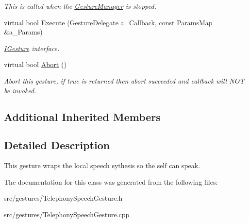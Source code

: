 \begin{DoxyCompactItemize}
\begin{DoxyCompactList}\small\item\em This is called when the \hyperlink{class_gesture_manager}{Gesture\+Manager} is stopped. \end{DoxyCompactList}\item 
\mbox{\label{class_telephony_speech_gesture_a9ee4eca6da4830ddcbcffd5c3a13cd30}} 
virtual bool \hyperlink{class_telephony_speech_gesture_a9ee4eca6da4830ddcbcffd5c3a13cd30}{Execute} (Gesture\+Delegate a\+\_\+\+Callback, const \hyperlink{class_params_map}{Params\+Map} \&a\+\_\+\+Params)
\begin{DoxyCompactList}\small\item\em \hyperlink{class_i_gesture}{I\+Gesture} interface. \end{DoxyCompactList}\item 
\mbox{\label{class_telephony_speech_gesture_a763ffe66a7747b2abc19203f9dc73352}} 
virtual bool \hyperlink{class_telephony_speech_gesture_a763ffe66a7747b2abc19203f9dc73352}{Abort} ()
\begin{DoxyCompactList}\small\item\em Abort this gesture, if true is returned then abort succeeded and callback will N\+OT be invoked. \end{DoxyCompactList}\end{DoxyCompactItemize}
\subsection*{Additional Inherited Members}


\subsection{Detailed Description}
This gesture wraps the local speech sythesis so the self can speak. 

The documentation for this class was generated from the following files\+:\begin{DoxyCompactItemize}
\item 
src/gestures/Telephony\+Speech\+Gesture.\+h\item 
src/gestures/Telephony\+Speech\+Gesture.\+cpp\end{DoxyCompactItemize}
